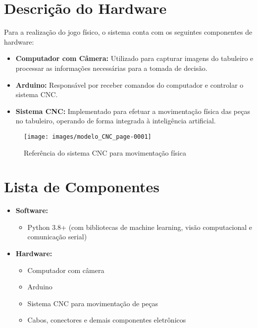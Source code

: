 \documentclass[a4paper,12pt]{article}
\begin{document}
\section{Descrição do Hardware}
Para a realização do jogo físico, o sistema conta com os seguintes componentes de hardware:
\begin{itemize}
    \item \textbf{Computador com Câmera:} Utilizado para capturar imagens do tabuleiro e processar as informações necessárias para a tomada de decisão.
    \item \textbf{Arduino:} Responsável por receber comandos do computador e controlar o sistema CNC.
    \item \textbf{Sistema CNC:} Implementado para efetuar a movimentação física das peças no tabuleiro, operando de forma integrada à inteligência artificial.
\end{itemize}

\begin{figure}[H]
    \centering
    \texttt{[image: images/modelo\_CNC\_page-0001]} %
    \caption{Referência do sistema CNC para movimentação física}
    \label{fig:modelo_cnc}
\end{figure}

\section{Lista de Componentes}
\begin{itemize}
    \item \textbf{Software:}
    \begin{itemize}
        \item Python 3.8+ (com bibliotecas de machine learning, visão computacional e comunicação serial)
    \end{itemize}
    \item \textbf{Hardware:}
    \begin{itemize}
        \item Computador com câmera
        \item Arduino
        \item Sistema CNC para movimentação de peças
        \item Cabos, conectores e demais componentes eletrônicos
    \end{itemize}
\end{itemize}

\vspace{1em}
\end{document}
